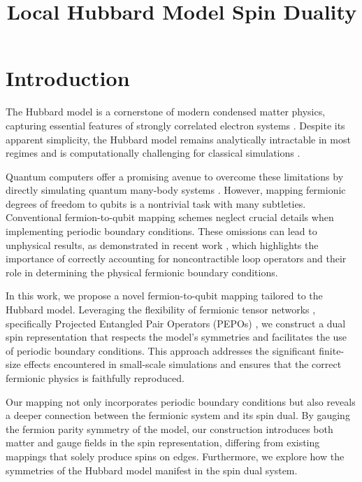 \documentclass[aps,prl,twocolumn,floatfix,10pt,amssymb,amsfont,amsmath,superscriptaddress,float,nofootinbib,longbibliography,nobalancelastpage]{revtex4-2}
\begin{document}
\title{Local Hubbard Model Spin Duality}

\begin{abstract}

\end{abstract}
\maketitle

\section{Introduction}
The Hubbard model is a cornerstone of modern condensed matter physics, capturing essential features of strongly correlated electron systems \cite{}. Despite its apparent simplicity, the Hubbard model remains analytically intractable in most regimes \cite{} and is computationally challenging for classical simulations \cite{}. 

Quantum computers offer a promising avenue to overcome these limitations by directly simulating quantum many-body systems \cite{}. However, mapping fermionic degrees of freedom to qubits is a nontrivial task with many subtleties. Conventional fermion-to-qubit mapping schemes 
\cite{Bravyi_2002,Verstraete_2005,Hastings:2014wyq, PhysRevA.94.030301, PhysRevA.95.032332,PhysRevResearch.1.033033, Steudtner_2019, Backens_2019,Jiang_2020, PhysRevB.104.035118,Chiew_2023,PRXQuantum.4.030314,PRXQuantum.4.010326,PhysRevB.109.115149}
 neglect crucial details when implementing periodic boundary conditions. These omissions can lead to unphysical results, as demonstrated in recent work \cite{OBrien:2024tiu}, which highlights the importance of correctly accounting for noncontractible loop operators and their role in determining the physical fermionic boundary conditions.

In this work, we propose a novel fermion-to-qubit mapping tailored to the Hubbard model. Leveraging the flexibility of fermionic tensor networks \cite{}, specifically Projected Entangled Pair Operators (PEPOs) \cite{}, we construct a dual spin representation that respects the model's symmetries and facilitates the use of periodic boundary conditions. This approach addresses the significant finite-size effects encountered in small-scale simulations and ensures that the correct fermionic physics is faithfully reproduced.

Our mapping not only incorporates periodic boundary conditions but also reveals a deeper connection between the fermionic system and its spin dual. By gauging the fermion parity symmetry of the model, our construction introduces both matter and gauge fields in the spin representation, differing from existing mappings that solely produce spins on edges. Furthermore, we explore how the symmetries of the Hubbard model manifest in the spin dual system.
\end{document}
